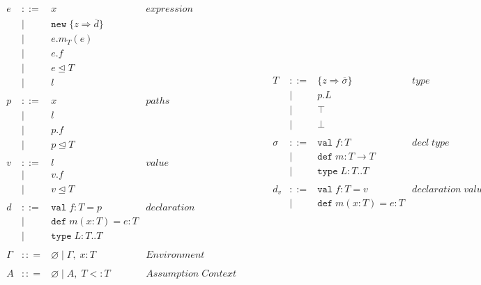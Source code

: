 \documentclass{llncs}
\numberwithin{subcase}{casethm}
\numberwithin{casethm}{theorem}
\numberwithin{casethm}{lemma}
\begin{document}
\begin{figure}[h]
\[
\begin{array}{lll}
\begin{array}{lllr}
e & ::= & x & expression \\
& | & \texttt{new} \; \{z \Rightarrow \overline{d}\}&\\
& | & e.m_T(e) &\\
& | & e.f &\\
& | & e \unlhd T&\\
& | & l &\\
&&\\
p & ::= & x & paths \\
& | & l &\\
& | & p.f &\\
& | & p \unlhd T &\\
&&\\
v & ::= & l & value \\
& | & v.f &\\
& | & v \unlhd T &\\
&&\\
d & ::= & \texttt{val} \; f : T = p & declaration \\
  & |   & \texttt{def} \; m(x:T) = e : T &\\
  & |   & \texttt{type} \; L : T .. T&\\
&&\\
\Gamma & :: = & \varnothing \; | \; \Gamma,\; x : T & Environment \\
&&\\
A & :: = & \varnothing \; | \; A,\; T <: T & Assumption \; Context \\
 \end{array}
& ~~~~~~
&
\begin{array}{lllr}
T & ::= & \{z \Rightarrow \overline{\sigma}\} & type \\
& | & p.L &\\
& | & \top & \\
& | & \bot & \\
&&\\
\sigma & ::= & \texttt{val} \; f:T & decl \; type\\
       & |   & \texttt{def} \; m:T \rightarrow T \\
		 & |   & \texttt{type} \; L : T .. T &\\
&&\\
d_v & ::= & \texttt{val} \; f : T = v & declaration \; value \\
  & |   & \texttt{def} \; m(x:T) = e : T &\\

\end{array}
\end{array}\]
\end{figure}
\end{document}
